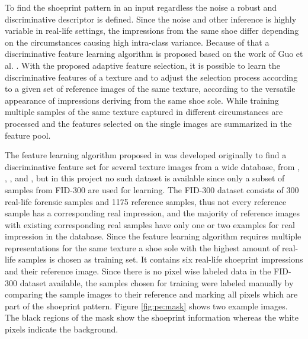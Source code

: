 \documentclass[draft,final]{vutinfth} %
\begin{document}
\par
To find the shoeprint pattern in an input regardless the noise a robust and discriminative descriptor is defined.
Since the noise and other inference is highly variable in real-life settings, the impressions from the same shoe differ depending on the circumstances causing high intra-class variance.
Because of that a discriminative feature learning algorithm is proposed based on the work of Guo et al. \cite{guo2012discriminative}.
With the proposed adaptive feature selection, it is possible to learn the discriminative features of a texture and to adjust the selection process according to a given set of reference images of the same texture, according to the versatile appearance of impressions deriving from the same shoe sole.
While training multiple samples of the same texture captured in different circumstances are processed and the features selected on the single images are summarized in the feature pool.
\par
The feature learning algorithm proposed in \cite{guo2012discriminative} was developed originally to find a discriminative feature set for several texture images from a wide database, from \cite{ojala2002outex}, \cite{dana1999reflectance}, \cite{boland2001neural}, \cite{jantzen2005pap} and \cite{brahnam2007introduction}, but in this project no such dataset is available since only a subset of samples from FID-300 are used for learning. 
The FID-300 \cite{kortylewski2014unsupervised} dataset consists of 300 real-life forensic samples and 1175 reference samples, thus not every reference sample has a corresponding real impression, and the majority of reference images with existing corresponding real samples have only one or two examples for real impression in the database.
Since the feature learning algorithm requires multiple representations for the same texture a shoe sole with the highest amount of real-life samples is chosen as training set.
It contains six real-life shoeprint impressions and their reference image. 
Since there is no pixel wise labeled data in the FID-300 dataset available, the samples chosen for training were labeled manually by comparing the sample images to their reference and marking all pixels which are part of the shoeprint pattern.
Figure \ref{fig:pe:mask} shows two example images. 
The black regions of the mask show the shoeprint information whereas the white pixels indicate the background.
\end{document}
